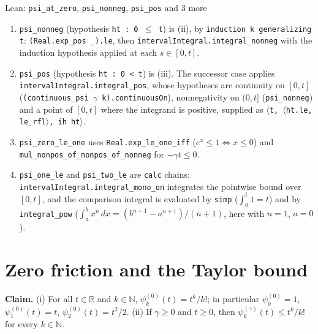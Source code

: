 \documentclass[11pt,a4paper]{article}
\begin{document}
\begin{leanbox}{Lean: \texttt{psi\_\allowbreak{}at\_\allowbreak{}zero}, \texttt{psi\_\allowbreak{}nonneg}, \texttt{psi\_\allowbreak{}pos} and 3 more}
\begin{enumerate}
\item \texttt{psi\_\allowbreak{}nonneg} (hypothesis \texttt{ht : 0 \ensuremath{\le} t}) is (ii), by \texttt{induction k generalizing t}: \texttt{(Real.\allowbreak{}exp\_\allowbreak{}pos \_\allowbreak{}).\allowbreak{}le}, then \texttt{interval\allowbreak{}Integral.\allowbreak{}integral\_\allowbreak{}nonneg} with the induction hypothesis applied at each \(s\in[0,t]\).

\item \texttt{psi\_\allowbreak{}pos} (hypothesis \texttt{ht : 0 < t}) is (iii). The successor case applies \texttt{interval\allowbreak{}Integral.\allowbreak{}integral\_\allowbreak{}pos}, whose hypotheses are continuity on \([0,t]\) (\texttt{(continuous\_\allowbreak{}psi \ensuremath{\gamma} k).\allowbreak{}continuous\allowbreak{}On}), nonnegativity on \((0,t]\) (\texttt{psi\_\allowbreak{}nonneg}) and a point of \([0,t]\) where the integrand is positive, supplied as \texttt{\ensuremath{\langle}t, \ensuremath{\langle}ht.\allowbreak{}le, le\_\allowbreak{}rfl\ensuremath{\rangle}, ih ht\ensuremath{\rangle}}.

\item \texttt{psi\_\allowbreak{}zero\_\allowbreak{}le\_\allowbreak{}one} uses \texttt{Real.\allowbreak{}exp\_\allowbreak{}le\_\allowbreak{}one\_\allowbreak{}iff} (\(e^x\le1\iff x\le0\)) and \texttt{mul\_\allowbreak{}nonpos\_\allowbreak{}of\_\allowbreak{}nonpos\_\allowbreak{}of\_\allowbreak{}nonneg} for \(-\gamma t\le0\).

\item \texttt{psi\_\allowbreak{}one\_\allowbreak{}le} and \texttt{psi\_\allowbreak{}two\_\allowbreak{}le} are \texttt{calc} chains: \texttt{interval\allowbreak{}Integral.\allowbreak{}integral\_\allowbreak{}mono\_\allowbreak{}on} integrates the pointwise bound over \([0,t]\), and the comparison integral is evaluated by \texttt{simp} (\(\int_0^t1=t\)) and by \texttt{integral\_\allowbreak{}pow} (\(\int_a^bx^n\,dx=(b^{n+1}-a^{n+1})/(n+1)\), here with \(n=1\), \(a=0\)).

\end{enumerate}
\end{leanbox}

\section{\texorpdfstring{Zero friction and the Taylor bound}{Zero friction and the Taylor bound}}


\textbf{Claim.} (i) For all \(t\in\mathbb R\) and \(k\in\mathbb N\), \(\psi_k^{(0)}(t)=t^k/k!\); in particular \(\psi_0^{(0)}=1\), \(\psi_1^{(0)}(t)=t\), \(\psi_2^{(0)}(t)=t^2/2\).
(ii) If \(\gamma\ge0\) and \(t\ge0\), then \(\psi_k^{(\gamma)}(t)\le t^k/k!\) for every \(k\in\mathbb N\).
\end{document}
